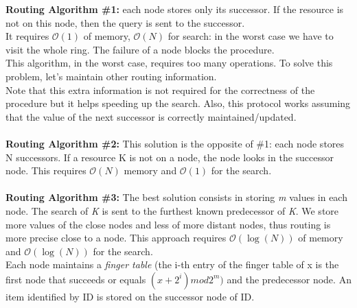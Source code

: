 \documentclass[paper=a4, fontsize=11pt]{scrartcl} %
\numberwithin{equation}{section} %
\numberwithin{figure}{section} %
\numberwithin{table}{section} %
\begin{document}
\textbf{Routing Algorithm \#1:} each node stores only its successor. If the resource is not on this node, then the query is sent to the successor.\\
It requires $\mathcal{O}(1)$ of memory, $\mathcal{O}(N)$ for search: in the worst case we have to visit the whole ring. The failure of a node blocks the procedure.\\
This algorithm, in the worst case, requires too many operations. To solve this problem, let's maintain other routing information.\\ Note that this extra information is not required for the correctness of the procedure but it helps speeding up the search. Also, this protocol works assuming that the value of the next successor is correctly maintained/updated.\\
~ \\
\textbf{Routing Algorithm \#2:}
This solution is the opposite of \#1: each node stores N successors. If a resource K is not on a node, the node looks in the successor node.
This requires $\mathcal{O}(N)$ memory and $\mathcal{O}(1)$ for the search.
\\ ~ \\
\textbf{Routing Algorithm \#3:}
The best solution consists in storing \textit{m} values in each node. The search of \textit{K} is sent to the furthest known predecessor of \textit{K}. We store more values of the close nodes and less of more distant nodes, thus routing is more precise close to a node. This approach requires $\mathcal{O}(\log(N))$ of memory and $\mathcal{O}(\log(N))$ for the search.\\
Each node maintains a \textit{finger table} (the i-th entry of the finger table of x is the first node that succeeds or equals $(x + 2^i) mod 2^m)$ and the predecessor node. An item identified by ID is stored on the successor node of ID.
\clearpage
\end{document}
